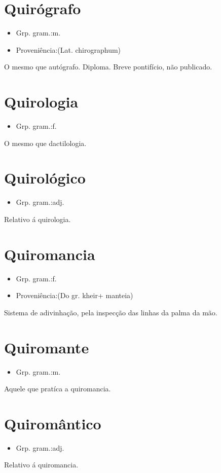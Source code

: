 \section{Quirógrafo}
\begin{itemize}
\item {Grp. gram.:m.}
\end{itemize}
\begin{itemize}
\item {Proveniência:(Lat. \textunderscore chirographum\textunderscore )}
\end{itemize}
O mesmo que \textunderscore autógrafo\textunderscore .
Diploma.
Breve pontifício, não publicado.
\section{Quirologia}
\begin{itemize}
\item {Grp. gram.:f.}
\end{itemize}
O mesmo que \textunderscore dactilologia\textunderscore .
\section{Quirológico}
\begin{itemize}
\item {Grp. gram.:adj.}
\end{itemize}
Relativo á quirologia.
\section{Quiromancia}
\begin{itemize}
\item {Grp. gram.:f.}
\end{itemize}
\begin{itemize}
\item {Proveniência:(Do gr. \textunderscore kheir\textunderscore  + \textunderscore manteia\textunderscore )}
\end{itemize}
Sistema de adivinhação, pela inspecção das linhas da palma da mão.
\section{Quiromante}
\begin{itemize}
\item {Grp. gram.:m.}
\end{itemize}
Aquele que pratíca a quiromancia.
\section{Quiromântico}
\begin{itemize}
\item {Grp. gram.:adj.}
\end{itemize}
Relativo á quiromancia.
